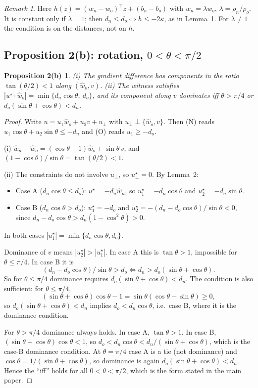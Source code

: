 \documentclass[10pt,a4paper]{article}
\newtheorem*{propb}{Proposition 2(b)}
\theoremstyle{remark}
\newtheorem*{remark}{Remark}
\newcommand{\hw}{\hat w}
\begin{document}
\begin{remark}
Here $h(z)=(w_n-w_o)^\top z+(b_n-b_o)$ with $w_n=\lambda w_o$, $\lambda=\rho_n/\rho_o$. It is constant only if $\lambda=1$; then $d_n\le d_o\iff h\le-2\kappa$, as in Lemma~1. For $\lambda\ne1$ the condition is on the distances, not on $h$.
\end{remark}

\subsection{Proposition 2(b): rotation, $0<\theta<\pi/2$}

\begin{propb}
(i) The gradient difference has components in the ratio $\tan(\theta/2)<1$ along $(\hw_o,v)$. (ii) The witness satisfies $|u^\star\cdot\hw_o|=\min\{d_n\cos\theta,\ d_o\}$, and its component along $v$ dominates iff $\theta>\pi/4$ or $d_o(\sin\theta+\cos\theta)<d_n$.
\end{propb}
\begin{proof}
Write $u=u_1\hw_o+u_2v+u_\perp$ with $u_\perp\perp\{\hw_o,v\}$. Then (N) reads $u_1\cos\theta+u_2\sin\theta\le-d_n$ and (O) reads $u_1\ge-d_o$.

(i) $\hw_n-\hw_o=(\cos\theta-1)\hw_o+\sin\theta\,v$, and $(1-\cos\theta)/\sin\theta=\tan(\theta/2)<1$.

(ii) The constraints do not involve $u_\perp$, so $u_\perp^\star=0$. By Lemma~2:
\begin{itemize}
\item Case A ($d_n\cos\theta\le d_o$): $u^\star=-d_n\hw_n$, so $u_1^\star=-d_n\cos\theta$ and $u_2^\star=-d_n\sin\theta$.
\item Case B ($d_n\cos\theta>d_o$): $u_1^\star=-d_o$ and $u_2^\star=-(d_n-d_o\cos\theta)/\sin\theta<0$, since $d_n-d_o\cos\theta>d_n(1-\cos^2\theta)>0$.
\end{itemize}
In both cases $|u_1^\star|=\min\{d_n\cos\theta,d_o\}$.

Dominance of $v$ means $|u_2^\star|>|u_1^\star|$. In case A this is $\tan\theta>1$, impossible for $\theta\le\pi/4$. In case B it is
\[
(d_n-d_o\cos\theta)/\sin\theta>d_o\iff d_n>d_o(\sin\theta+\cos\theta).
\]
So for $\theta\le\pi/4$ dominance requires $d_o(\sin\theta+\cos\theta)<d_n$. The condition is also sufficient: for $\theta\le\pi/4$,
\[
(\sin\theta+\cos\theta)\cos\theta-1=\sin\theta(\cos\theta-\sin\theta)\ge0,
\]
so $d_o(\sin\theta+\cos\theta)<d_n$ implies $d_o<d_n\cos\theta$, i.e.\ case B, where it is the dominance condition.

For $\theta>\pi/4$ dominance always holds. In case A, $\tan\theta>1$. In case B, $(\sin\theta+\cos\theta)\cos\theta<1$, so $d_o<d_n\cos\theta<d_n/(\sin\theta+\cos\theta)$, which is the case-B dominance condition. At $\theta=\pi/4$ case A is a tie (not dominance) and $\cos\theta=1/(\sin\theta+\cos\theta)$, so dominance is again $d_o(\sin\theta+\cos\theta)<d_n$. Hence the ``iff'' holds for all $0<\theta<\pi/2$, which is the form stated in the main paper.
\end{proof}
\end{document}
